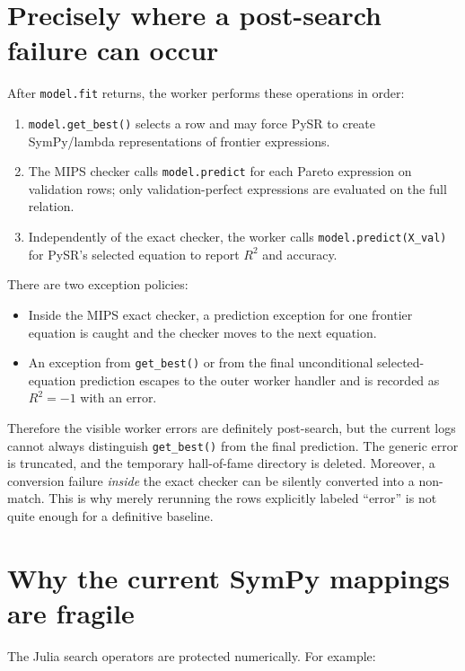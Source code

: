 \documentclass[10pt]{article}
\begin{document}
\section{Precisely where a post-search failure can occur}

After \texttt{model.fit} returns, the worker performs these operations in order:

\begin{enumerate}
  \item \texttt{model.get\_best()} selects a row and may force PySR to create
        SymPy/lambda representations of frontier expressions.
  \item The MIPS checker calls \texttt{model.predict} for each Pareto expression
        on validation rows; only validation-perfect expressions are evaluated
        on the full relation.
  \item Independently of the exact checker, the worker calls
        \texttt{model.predict(X\_val)} for PySR's selected equation to report
        $R^2$ and accuracy.
\end{enumerate}

There are two exception policies:

\begin{itemize}
  \item Inside the MIPS exact checker, a prediction exception for one frontier
        equation is caught and the checker moves to the next equation.
  \item An exception from \texttt{get\_best()} or from the final unconditional
        selected-equation prediction escapes to the outer worker handler and is
        recorded as $R^2=-1$ with an error.
\end{itemize}

Therefore the visible worker errors are definitely post-search, but the current
logs cannot always distinguish \texttt{get\_best()} from the final prediction.
The generic error is truncated, and the temporary hall-of-fame directory is
deleted.  Moreover, a conversion failure \emph{inside} the exact checker can be
silently converted into a non-match.  This is why merely rerunning the rows
explicitly labeled ``error'' is not quite enough for a definitive baseline.

\section{Why the current SymPy mappings are fragile}

The Julia search operators are protected numerically.  For example:
\end{document}
